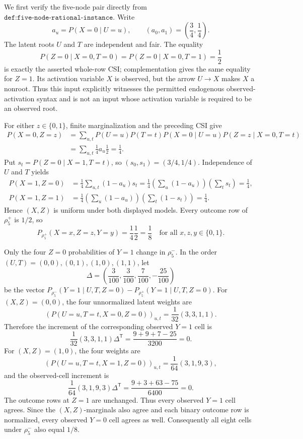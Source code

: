 We first verify the five-node pair directly from \(\texttt{def:five-node-rational-instance}\).  Write
\[
 a_u=P(X=0\mid U=u),\qquad (a_0,a_1)=\left(\frac34,\frac14\right).
\]
The latent roots \(U\) and \(T\) are independent and fair.  The equality
\[
 P(Z=0\mid X=0,T=0)=P(Z=0\mid X=0,T=1)=\frac12
\]
is exactly the asserted whole-row CSI; complementation gives the same equality for \(Z=1\).  Its activation variable \(X\) is observed, but the arrow \(U\to X\) makes \(X\) a nonroot.  Thus this input explicitly witnesses the permitted endogenous observed-activation syntax and is not an input whose activation variable is required to be an observed root.

For either \(z\in\{0,1\}\), finite marginalization and the preceding CSI give
\[
 \begin{aligned}
 P(X=0,Z=z)
 &=\sum_{u,t}P(U=u)P(T=t)P(X=0\mid U=u)P(Z=z\mid X=0,T=t)\\
 &=\sum_{u,t}\frac14 a_u\frac12
 =\frac14.
 \end{aligned}
\]
Put \(s_t=P(Z=0\mid X=1,T=t)\), so \((s_0,s_1)=(3/4,1/4)\).  Independence of \(U\) and \(T\) yields
\[
 \begin{aligned}
 P(X=1,Z=0)
 &=\frac14\sum_{u,t}(1-a_u)s_t
 =\frac14\left(\sum_u(1-a_u)\right)\left(\sum_t s_t\right)
 =\frac14,\\
 P(X=1,Z=1)
 &=\frac14\left(\sum_u(1-a_u)\right)\left(\sum_t(1-s_t)\right)
 =\frac14.
 \end{aligned}
\]
Hence \((X,Z)\) is uniform under both displayed models.  Every outcome row of \(\rho^+_5\) is \(1/2\), so
\[
 P_{\rho^+_5}(X=x,Z=z,Y=y)=\frac14\frac12=\frac18
 \quad\text{for all }x,z,y\in\{0,1\}.
\]

Only the four \(Z=0\) probabilities of \(Y=1\) change in \(\rho^-_5\).  In the order \((U,T)=(0,0),(0,1),(1,0),(1,1)\), let
\[
 \Delta=\left(\frac3{100},\frac3{100},\frac7{100},-\frac{25}{100}\right)
\]
be the vector \(P_{\rho^-_5}(Y=1\mid U,T,Z=0)-P_{\rho^+_5}(Y=1\mid U,T,Z=0)\).  For \((X,Z)=(0,0)\), the four unnormalized latent weights are
\[
 \left(P(U=u,T=t,X=0,Z=0)\right)_{u,t}
 =\frac1{32}(3,3,1,1).
\]
Therefore the increment of the corresponding observed \(Y=1\) cell is
\[
 \frac1{32}(3,3,1,1)\Delta^{\mathsf T}
 =\frac{9+9+7-25}{3200}=0.
\]
For \((X,Z)=(1,0)\), the four weights are
\[
 \left(P(U=u,T=t,X=1,Z=0)\right)_{u,t}
 =\frac1{64}(3,1,9,3),
\]
and the observed-cell increment is
\[
 \frac1{64}(3,1,9,3)\Delta^{\mathsf T}
 =\frac{9+3+63-75}{6400}=0.
\]
The outcome rows at \(Z=1\) are unchanged.  Thus every observed \(Y=1\) cell agrees.  Since the \((X,Z)\)-marginals also agree and each binary outcome row is normalized, every observed \(Y=0\) cell agrees as well.  Consequently all eight cells under \(\rho^-_5\) also equal \(1/8\).

